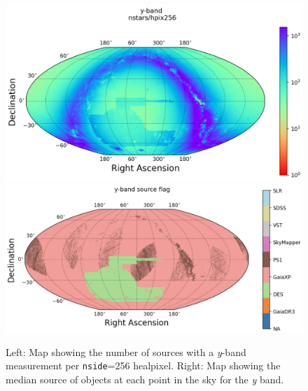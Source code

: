 \begin{figure}
    \includegraphics[width=0.48\linewidth]{./figures/source_density_maps/y-band-counts-full.png}
    \includegraphics[width=0.48\linewidth]{./figures/source_survey_maps/y-band_source.png}
    \caption{Left: Map showing the number of sources with a \textit{y}-band measurement per \texttt{nside}=256 healpixel.
    Right: Map showing the median source of objects at each point in the sky for the \textit{y} band.}
    \label{fig:monster-y}
\end{figure}
